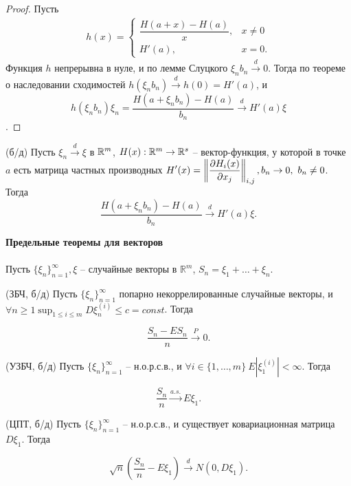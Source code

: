 \begin{proof}
	Пусть
	\begin{gather*}
	    h( x) =\begin{cases}
		\dfrac{H( a+x) -H( a)}{x}, & x\neq 0\\
		H'( a), & x=0.
	\end{cases}
	\end{gather*}
    Функция $h$ непрерывна в нуле, и по лемме Слуцкого $\xi_nb_n \xrightarrow{d} 0$. Тогда по теореме о наследовании сходимостей $\displaystyle h\left(\xi_nb_n\right) \xrightarrow{d} h\left(0\right) = H'(a)$, и
	\begin{equation*}
		h\left(\xi_nb_n\right)\xi_n = \frac{H(a + \xi_nb_n) - H(a)}{b_n} \xrightarrow{d} H'(a)\xi
	\end{equation*}.
\end{proof}
\begin{proposition}
	(б/д) Пусть $\xi_n \xrightarrow{d} \xi$ в $\mathbb{R}^m$, $H(x):\mathbb{R}^m \rightarrow \mathbb{R}^s$ -- вектор-функция, у которой в точке $a$ есть матрица частных производных $\displaystyle H'(x) = \left\Vert\frac{\partial H_i(x)}{\partial x_j}\right\Vert_{i,j},\\ b_n\rightarrow 0,\ b_n \ne 0$. Тогда
	\begin{equation*}
		\frac{H(a + \xi_nb_n) - H(a)}{b_n} \xrightarrow{d} H'(a)\xi.
	\end{equation*}
\end{proposition}
\textbf{Предельные теоремы для векторов}
\\
\\Пусть $\displaystyle \{\xi _{n}\}_{n=1}^{\infty } ,\xi $ -- случайные векторы в $\displaystyle \mathbb{R}^{m}$, $\displaystyle S_{n} =\xi _{1} +\dotsc +\xi _{n}$.
\begin{theorem}
	(ЗБЧ, б/д) Пусть $\displaystyle \{\xi _{n}\}_{n=1}^{\infty}$ попарно некоррелированные случайные векторы, и $\displaystyle \forall n \ge 1 \sup_{1\le i\le m} D\xi _{n}^{( i)} \leqslant c=const$. Тогда
	
	
	\begin{equation*}
		\frac{S_{n} -ES_{n}}{n}\xrightarrow{P} 0.
	\end{equation*}
\end{theorem}
\begin{theorem}
	(УЗБЧ, б/д) Пусть $\displaystyle \{\xi _{n}\}_{n=1}^{\infty }$ -- н.о.р.с.в., и $\displaystyle \forall i\in \{1,\dotsc ,m\} \ E\left| \xi _{1}^{( i)}\right| < \infty $. Тогда
	
	
	\begin{equation*}
		\frac{S_{n}}{n}\xrightarrow{a.s.} E\xi_{1} .
	\end{equation*}
\end{theorem}
\begin{theorem}
	(ЦПТ, б/д) Пусть $\displaystyle \{\xi _{n}\}_{n=1}^{\infty }$ -- н.о.р.с.в., и существует ковариационная матрица $\displaystyle D\xi _{1}$. Тогда
	
	
	\begin{equation*}
		\sqrt{n}\left(\frac{S_{n}}{n} -E\xi_{1}\right)\xrightarrow{d} N( 0,D\xi_{1}) .
	\end{equation*}
\end{theorem}